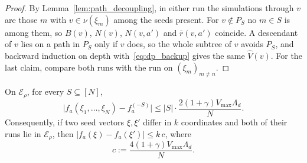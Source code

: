 \begin{proof}
By Lemma~\ref{lem:path_decoupling}, in either run the simulations through $v$ are those $m$ with $v\in\nu(\xi_m)$ among the seeds present.
For $v\notin P_S$ no $m\in S$ is among them, so $B(v)$, $N(v)$, $N(v,a')$ and $\bar r(v,a')$ coincide.
A descendant of $v$ lies on a path in $P_S$ only if $v$ does, so the whole subtree of $v$ avoids $P_S$, and backward induction on depth with~\eqref{eq:dp_backup} gives the same $\hat V(v)$.
For the last claim, compare both runs with the run on $(\xi_m)_{m\ne n}$.
\end{proof}

\begin{lem}\label{lem:bounded_difference}
On $\mathcal E_\rho$, for every $S\subseteq[N]$,
\begin{equation}\label{eq:bd_removal}
\bigl|f_a(\xi_1,\ldots,\xi_N)-f_a^{(-S)}\bigr|\le|S|\cdot\frac{2(1+\gamma)V_{\max}\Lambda_d}{N}.
\end{equation}
Consequently, if two seed vectors $\xi,\xi'$ differ in $k$ coordinates and both of their runs lie in $\mathcal E_\rho$, then $|f_a(\xi)-f_a(\xi')|\le k\,c$, where
\begin{equation}\label{eq:bd_constant}
c:=\frac{4(1+\gamma)V_{\max}\Lambda_d}{N}.
\end{equation}
\end{lem}

